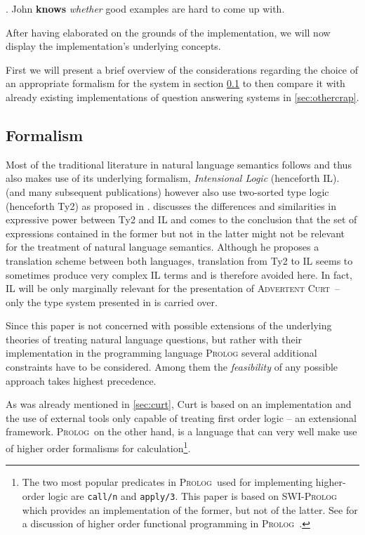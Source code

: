 \documentclass[a4paper]{article}
\newcommand{\abbr}{\textsf} %
\newcommand{\stress}{\textbf} %
\newcommand{\code}{\texttt} %
\newcommand{\pn}{\textsc} %
\newcommand{\acurt}{\pn{Advertent Curt}\mbox{ }}
\newcommand{\prol}{\pn{Prolog}\mbox{ }}
\begin{document}
\ex. John \stress{knows} \emph{whether} good examples are hard to come up with.

After having elaborated on the grounds of the implementation, we will now
display the implementation's underlying concepts. %


First we will present a brief overview of the considerations regarding the
choice of an appropriate formalism for the system in section \ref{sec:formal}
to then compare it with already existing implementations of question answering
systems in \ref{sec:othercrap}.

\subsection{Formalism}\label{sec:formal}


Most of the traditional literature in natural language semantics follows
\cite{ptq} and thus also makes use of its underlying formalism,
\emph{Intensional Logic} (henceforth \abbr{IL}). \cite{gs:sqpa} (and many subsequent
publications) however also use two-sorted type logic (henceforth \abbr{Ty2}) as
proposed in \cite{gallin:ty2}. \cite{z:ilty2} discusses the differences and
similarities in expressive power between \abbr{Ty2} and \abbr{IL} and comes to
the conclusion that the set of expressions contained in the former but not in
the latter might not be relevant for the treatment of natural language
semantics. Although he proposes a translation scheme between both languages,
translation from \abbr{Ty2} to \abbr{IL} seems to sometimes produce very complex
\abbr{IL} terms and is therefore avoided here. In fact, \abbr{IL} will be only
marginally relevant for the presentation of \acurt – only the type system
presented in \cite{ptq} is carried over.


Since this paper is not concerned with possible extensions of the underlying
theories of treating natural language questions, but rather with their
implementation in the programming language \pn{Prolog} several additional
constraints have to be considered. Among them the \emph{feasibility} of any
possible approach takes highest precedence.

As was already mentioned in \ref{sec:curt}, Curt is based on an
implementation and the use of external tools only capable of treating first
order logic – an extensional framework. \prol on the other hand, is a language
that can very well make use of higher order formalisms for
calculation\footnote{The two most popular predicates in \prol used for
implementing higher-order logic are
\code{call/n} and \code{apply/3}. This paper is based on \pn{SWI-Prolog} which
provides an implementation of the former, but not of the latter. See
\cite{naish:prolhio} for a discussion of higher order functional programming in
\prol.}.
\end{document}
